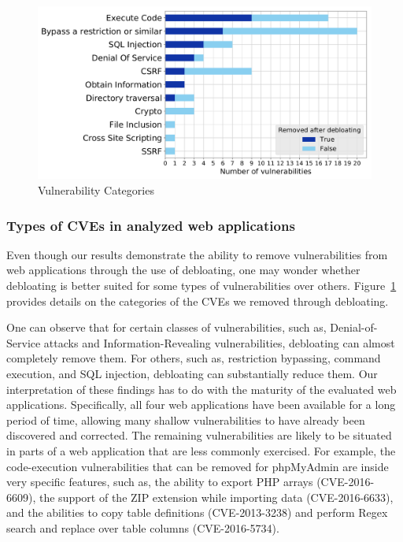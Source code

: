 \begin{figure}[t]
  \includegraphics[width=\linewidth]{figures/lim/vuln_per_category.pdf}
  \caption{Vulnerability Categories}
  \label{fig:vulnpercat}
\end{figure}

\subsubsection{Types of CVEs in analyzed web applications}

Even though our results demonstrate the ability to remove vulnerabilities
from web applications through the use of debloating, one may wonder
whether debloating is better suited for some types of vulnerabilities over
others. Figure~\ref{fig:vulnpercat} provides details on the categories of
the CVEs we removed through debloating.


One can observe that for certain classes of vulnerabilities, such as,
Denial-of-Service attacks and Information-Revealing vulnerabilities,
debloating can almost completely remove them.
For others, such as, restriction bypassing, command execution, and
SQL injection, debloating can substantially reduce them.
Our interpretation of these findings has to do with the maturity of
the evaluated web applications. Specifically, all four web applications
have been available for a long period of time, allowing many shallow
vulnerabilities to have already been discovered and corrected. The remaining
vulnerabilities are likely to be situated in parts of a web application that
are less commonly exercised. For example, the code-execution vulnerabilities
that can be removed for phpMyAdmin are inside very specific features, such as,
the ability to export PHP arrays (CVE-2016-6609), the support of the
ZIP extension while importing data (CVE-2016-6633), and the abilities
to copy table definitions (CVE-2013-3238) and perform Regex search and replace over table columns
(CVE-2016-5734).


